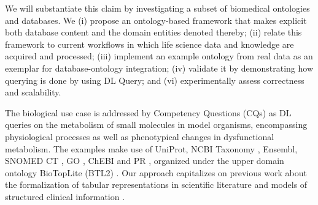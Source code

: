 We will substantiate this claim by investigating a subset of biomedical ontologies and databases. We (i) propose an ontology-based framework that makes explicit both database content and the domain entities denoted thereby; (ii) relate this framework to current workflows in which life science data and knowledge are acquired and processed; (iii) implement an example ontology from real data as an exemplar for database-ontology integration; (iv) validate it by demonstrating how querying is done by using DL Query; and (vi) experimentally assess correctness and scalability.

The biological use case is addressed by Competency Questions (CQs) \citep{Gruninger1994} as DL queries on the metabolism of small molecules in model organisms, encompassing physiological processes as well as phenotypical changes in dysfunctional  metabolism. The examples make use of UniProt, NCBI Taxonomy \citep{NCBI2015}, Ensembl\citep{Cunningham2014}, SNOMED CT \citep{IHTSDO2015}, GO \citep{Gene2014a}, ChEBI \citep{Hastings2013} and PR \citep{Natale2014}, organized under the upper domain ontology BioTopLite (BTL2) \citep{Schulz2012}. Our approach capitalizes on previous work about the formalization of tabular representations in scientific literature \citep{Santana2011b} and models of structured clinical information \citep{Martinez-Costa2015}.



